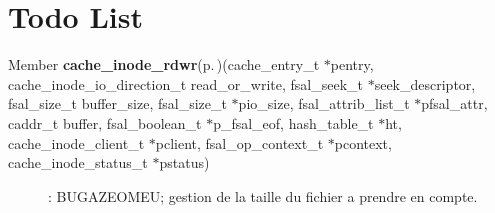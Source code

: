 \section{Todo List}\label{todo}
\label{todo__todo000001}
 \begin{description}
\item[Member {\bf cache\_\-inode\_\-rdwr}{\rm (p.\,\pageref{cache__inode__rdwr_8c_a0})}(cache\_\-entry\_\-t $\ast$pentry, cache\_\-inode\_\-io\_\-direction\_\-t read\_\-or\_\-write, fsal\_\-seek\_\-t $\ast$seek\_\-descriptor, fsal\_\-size\_\-t buffer\_\-size, fsal\_\-size\_\-t $\ast$pio\_\-size, fsal\_\-attrib\_\-list\_\-t $\ast$pfsal\_\-attr, caddr\_\-t buffer, fsal\_\-boolean\_\-t $\ast$p\_\-fsal\_\-eof, hash\_\-table\_\-t $\ast$ht, cache\_\-inode\_\-client\_\-t $\ast$pclient, fsal\_\-op\_\-context\_\-t $\ast$pcontext, cache\_\-inode\_\-status\_\-t $\ast$pstatus) ]: BUGAZEOMEU; gestion de la taille du fichier a prendre en compte. \end{description}

